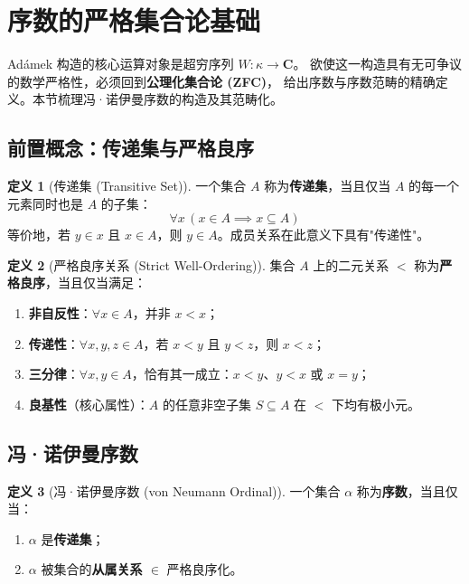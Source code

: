 \documentclass[UTF8,a4paper,12pt]{ctexart}
\theoremstyle{definition}
\newtheorem{definition}{定义}[section]
\theoremstyle{plain}
\theoremstyle{remark}
\newcommand{\cat}[1]{\mathbf{#1}}
\begin{document}
\section{序数的严格集合论基础}
\label{sec:ordinal}

Adámek 构造的核心运算对象是超穷序列 $W: \kappa \to \cat{C}$。
欲使这一构造具有无可争议的数学严格性，必须回到\textbf{公理化集合论 (ZFC)}，
给出序数与序数范畴的精确定义。本节梳理冯·诺伊曼序数的构造及其范畴化。

\subsection{前置概念：传递集与严格良序}

\begin{definition}[传递集 (Transitive Set)]
一个集合 $A$ 称为\textbf{传递集}，当且仅当 $A$ 的每一个元素同时也是 $A$ 的子集：
\[
\forall x\,(x \in A \implies x \subseteq A)
\]
等价地，若 $y \in x$ 且 $x \in A$，则 $y \in A$。成员关系在此意义下具有"传递性"。
\end{definition}

\begin{definition}[严格良序关系 (Strict Well-Ordering)]
集合 $A$ 上的二元关系 $<$ 称为\textbf{严格良序}，当且仅当满足：
\begin{enumerate}
    \item \textbf{非自反性}：$\forall x \in A$，并非 $x < x$；
    \item \textbf{传递性}：$\forall x, y, z \in A$，若 $x < y$ 且 $y < z$，则 $x < z$；
    \item \textbf{三分律}：$\forall x, y \in A$，恰有其一成立：$x < y$、$y < x$ 或 $x = y$；
    \item \textbf{良基性}（核心属性）：$A$ 的任意非空子集 $S \subseteq A$ 在 $<$ 下均有极小元。
\end{enumerate}
\end{definition}

\subsection{冯·诺伊曼序数}

\begin{definition}[冯·诺伊曼序数 (von Neumann Ordinal)]
一个集合 $\alpha$ 称为\textbf{序数}，当且仅当：
\begin{enumerate}
    \item $\alpha$ 是\textbf{传递集}；
    \item $\alpha$ 被集合的\textbf{从属关系 $\in$} 严格良序化。
\end{enumerate}
\end{definition}
\end{document}
